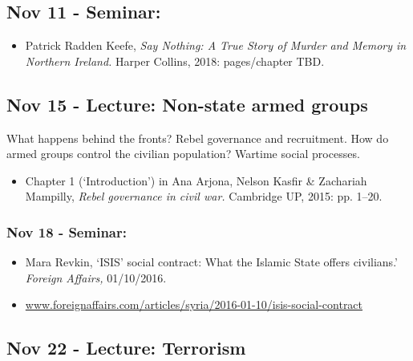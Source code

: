 \documentclass[12pt, a4paper]{article}
\begin{document}
\subsection*{Nov 11 - Seminar:}

\begin{itemize}
\setlength\itemsep{0pt}
\item Patrick Radden Keefe, \textit{Say Nothing: A True Story of Murder and Memory in Northern Ireland. }Harper Collins, 2018: pages/chapter TBD.
\end{itemize}

\subsection*{Nov 15 - Lecture: Non-state armed groups}

What happens behind the fronts? Rebel governance and recruitment. How do armed groups control the civilian population? Wartime social processes.

\begin{itemize}
\setlength\itemsep{0pt}
\item Chapter 1 (`Introduction') in Ana Arjona, Nelson Kasfir \& Zachariah Mampilly, \textit{Rebel governance in civil war.} Cambridge UP, 2015: pp. 1--20.
\end{itemize}

\subsubsection*{Nov 18 - Seminar:}

\begin{itemize}
\setlength\itemsep{-5pt}
\item Mara Revkin, `ISIS' social contract: What the Islamic State off ers civilians.' \textit{Foreign Affairs,} 01/10/2016.
\item[] \href{https://www.foreignaffairs.com/articles/syria/2016-01-10/isis-social-contract}{www.foreignaffairs.com/articles/syria/2016-01-10/isis-social-contract}
\end{itemize}

\subsection*{Nov 22 - Lecture: Terrorism}
\end{document}
